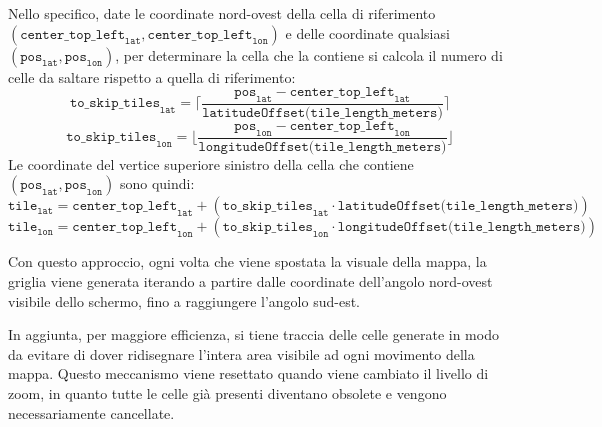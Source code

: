 Nello specifico, date le coordinate nord-ovest della cella di riferimento $(\texttt{center\_top\_left}_{\texttt{lat}}, \texttt{center\_top\_left}_{\texttt{lon}})$ e delle coordinate qualsiasi $(\texttt{pos}_{\texttt{lat}}, \texttt{pos}_{\texttt{lon}})$, per determinare la cella che la contiene si calcola il numero di celle da saltare rispetto a quella di riferimento: 
\begin{equation*}
    \texttt{to\_skip\_tiles}_\texttt{lat} =
        \lceil \frac{\texttt{pos}_{\texttt{lat}} - \texttt{center\_top\_left}_{\texttt{lat}}}{\texttt{latitudeOffset(tile\_length\_meters)}} \rceil
\end{equation*}
\begin{equation*}
    \texttt{to\_skip\_tiles}_\texttt{lon} =
        \lfloor \frac{\texttt{pos}_{\texttt{lon}} - \texttt{center\_top\_left}_{\texttt{lon}}}{\texttt{longitudeOffset(tile\_length\_meters)}} \rfloor
\end{equation*}
Le coordinate del vertice superiore sinistro della cella che contiene $(\texttt{pos}_{\texttt{lat}}, \texttt{pos}_{\texttt{lon}})$ sono quindi:
\begin{equation*}
    \texttt{tile}_\texttt{lat} = \texttt{center\_top\_left}_{\texttt{lat}} + (\texttt{to\_skip\_tiles}_\texttt{lat} \cdot \texttt{latitudeOffset(tile\_length\_meters)})
\end{equation*}
\begin{equation*}
    \texttt{tile}_\texttt{lon} = \texttt{center\_top\_left}_{\texttt{lon}} + (\texttt{to\_skip\_tiles}_\texttt{lon} \cdot \texttt{longitudeOffset(tile\_length\_meters)})
\end{equation*}

Con questo approccio, ogni volta che viene spostata la visuale della mappa, la griglia viene generata iterando a partire dalle coordinate dell'angolo nord-ovest visibile dello schermo, fino a raggiungere l'angolo sud-est. 

In aggiunta, per maggiore efficienza, si tiene traccia delle celle generate in modo da evitare di dover ridisegnare l'intera area visibile ad ogni movimento della mappa. Questo meccanismo viene resettato quando viene cambiato il livello di zoom, in quanto tutte le celle già presenti diventano obsolete e vengono necessariamente cancellate.